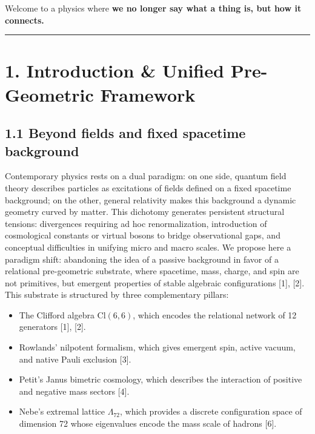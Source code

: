 \documentclass[11pt]{article}
\providecommand{\tightlist}{\setlength{\itemsep}{2pt}\setlength{\parskip}{6pt}}
\providecommand{\tightlist}{%
  \setlength{\itemsep}{2pt}\setlength{\parskip}{6pt}
}
\begin{document}
Welcome to a physics where \textbf{we no longer say what a thing is, but
how it connects.}

\begin{center}\rule{0.5\linewidth}{0.5pt}\end{center}

\hypertarget{introduction-unified-pre-geometric-framework}{%
\section{1. Introduction \& Unified Pre-Geometric
Framework}\label{introduction-unified-pre-geometric-framework}}

\hypertarget{beyond-fields-and-fixed-spacetime-background}{%
\subsection{1.1 Beyond fields and fixed spacetime
background}\label{beyond-fields-and-fixed-spacetime-background}}

Contemporary physics rests on a dual paradigm: on one side, quantum
field theory describes particles as excitations of fields defined on a
fixed spacetime background; on the other, general relativity makes this
background a dynamic geometry curved by matter. This dichotomy generates
persistent structural tensions: divergences requiring ad hoc
renormalization, introduction of cosmological constants or virtual
bosons to bridge observational gaps, and conceptual difficulties in
unifying micro and macro scales. We propose here a paradigm shift:
abandoning the idea of a passive background in favor of a relational
pre-geometric substrate, where spacetime, mass, charge, and spin are not
primitives, but emergent properties of stable algebraic configurations
{[}1{]}, {[}2{]}. This substrate is structured by three complementary
pillars:

\begin{itemize}
\tightlist
\item
  The Clifford algebra \(\text{Cl}(6,6)\), which encodes the relational
  network of 12 generators {[}1{]}, {[}2{]}.
\item
  Rowlands' nilpotent formalism, which gives emergent spin, active
  vacuum, and native Pauli exclusion {[}3{]}.
\item
  Petit's Janus bimetric cosmology, which describes the interaction of
  positive and negative mass sectors {[}4{]}.
\item
  Nebe's extremal lattice \(\Lambda_{72}\), which provides a discrete
  configuration space of dimension 72 whose eigenvalues encode the mass
  scale of hadrons {[}6{]}.
\end{itemize}
\end{document}
